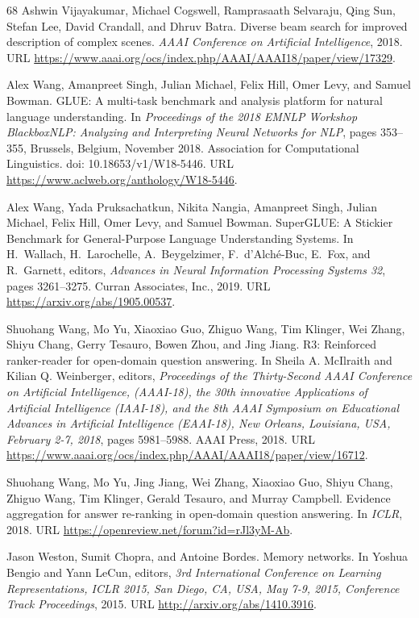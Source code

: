 \documentclass[10pt,letterpaper]{article}
\begin{document}
{\begin{thebibliography}{68}
 Ashwin Vijayakumar, Michael Cogswell, Ramprasaath Selvaraju, Qing
Sun, Stefan Lee, David Crandall, and Dhruv Batra. Diverse beam search for
improved description of complex scenes. \emph{AAAI Conference on Artificial
Intelligence}, 2018. URL
\url{https://www.aaai.org/ocs/index.php/AAAI/AAAI18/paper/view/17329}.

 Alex Wang, Amanpreet Singh, Julian Michael, Felix Hill, Omer
Levy, and Samuel Bowman. GLUE: A multi-task benchmark and analysis platform for
natural language understanding. In \emph{Proceedings of the 2018 EMNLP Workshop
BlackboxNLP: Analyzing and Interpreting Neural Networks for NLP}, pages
353--355, Brussels, Belgium, November 2018. Association for Computational
Linguistics. doi: 10.18653/v1/W18-5446. URL
\url{https://www.aclweb.org/anthology/W18-5446}.

 Alex Wang, Yada Pruksachatkun, Nikita Nangia, Amanpreet Singh,
Julian Michael, Felix Hill, Omer Levy, and Samuel Bowman. SuperGLUE: A Stickier
Benchmark for General-Purpose Language Understanding Systems. In H.~Wallach,
H.~Larochelle, A.~Beygelzimer, F.~d'Alché-Buc, E.~Fox, and R.~Garnett,
editors, \emph{Advances in Neural Information Processing Systems 32}, pages
3261--3275. Curran Associates, Inc., 2019. URL
\url{https://arxiv.org/abs/1905.00537}.

 Shuohang Wang, Mo Yu, Xiaoxiao Guo, Zhiguo Wang, Tim Klinger, Wei
Zhang, Shiyu Chang, Gerry Tesauro, Bowen Zhou, and Jing Jiang. R3: Reinforced
ranker-reader for open-domain question answering. In Sheila A. McIlraith and
Kilian Q. Weinberger, editors, \emph{Proceedings of the Thirty-Second AAAI
Conference on Artificial Intelligence, (AAAI-18), the 30th innovative
Applications of Artificial Intelligence (IAAI-18), and the 8th AAAI Symposium
on Educational Advances in Artificial Intelligence (EAAI-18), New Orleans,
Louisiana, USA, February 2-7, 2018}, pages 5981--5988. AAAI Press, 2018. URL
\url{https://www.aaai.org/ocs/index.php/AAAI/AAAI18/paper/view/16712}.

 Shuohang Wang, Mo Yu, Jing Jiang, Wei Zhang, Xiaoxiao Guo, Shiyu
Chang, Zhiguo Wang, Tim Klinger, Gerald Tesauro, and Murray Campbell. Evidence
aggregation for answer re-ranking in open-domain question answering. In
\emph{ICLR}, 2018. URL \url{https://openreview.net/forum?id=rJl3yM-Ab}.

 Jason Weston, Sumit Chopra, and Antoine Bordes. Memory networks.
In Yoshua Bengio and Yann LeCun, editors, \emph{3rd International Conference on
Learning Representations, ICLR 2015, San Diego, CA, USA, May 7-9, 2015,
Conference Track Proceedings}, 2015. URL \url{http://arxiv.org/abs/1410.3916}.


\end{thebibliography}}
\end{document}

